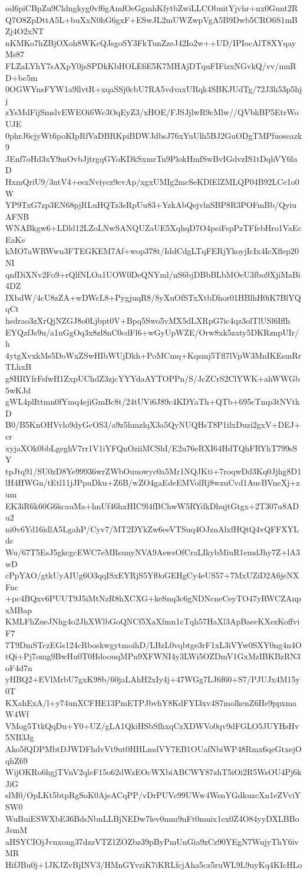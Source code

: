 od6piCBpZu9Cldngkyg0vf6gAmfOeGgmhKfytbZwiLLCObnitYjvhr+nx0Gunt2R
Q7O8ZpDttA5L+buXxN0hG6gxF+ESwJL2mUWZwpVgA5B9Dwb5CRO6S1mBZj4O2xNT
nKMKo7hZBjOXoh8WKcQJsgoSY3FkTunZzeJ42Io2w++UD/IPIocAlT8XYqayMs87
FLZaLYhY7sAXpY0jsSPDkKbHOLE6E5K7MHAjDTquFIFizxNGvkQ/vv/muRD+bc5m
0OGWYnsFYW1a9llvtR+xqaSSj0cbU7RA5vdvaxURqk4SBKJUdTg/72J3h53p5hjj
zYsMdFijSmslvEWEOi6Wc3OqEyZ3/xHOE/FJSJjlwR9cMlw//QVbkBP5EtrWoUJE
0phrJ6cjyWt6poKIpRfVaDBRKpiBDWJdbsJ76xYuUlh5BJ2GuODgTMPfuoseazk9
JEnf7oHd3xY9mOvbJjtrgqGYoKDkSxmrTn9PlokHmfSwBvIGdvzIS1tDqhVY6laD
HxmQriU9/3ntV4+esxNviycz9cvAp/xgxUMIg2mcSeKDlElZMLQP04B92LCe1o0W
YP9TxG7zp3EN68pjRLuHQTz3sRpUu83+YzkAbQejvlnSBP8R3POFmBb/QyiuAFNB
WNABkgw6+LDld12LZoLNwSANQUZaUE5XqhqD7O4peiFspPzTFfebHro1VaEcEaKe
kMO7aWRWwu3FTEGKEM7Af+wop378t/IddCdgLTqFERjYkoyjIcIx4IcXflep20NI
qnfDiXNv2Fo9+rQlfNLOa1UOW0DeQNYml/nS6bjDBbBLbMOeU3fbo9XjiMaBi4DZ
IXbdW/4cU8zZA+wDWcL8+PygjuqR8/8yXuOfSTxXtbDhor01HBlhH0iK7BlYQqCt
hsdrao3zXrQjNZGJ8o0Ljbpt0V+Bpq5Swo5vMX5dLXRpG7ic4qz3olTlUSl6Iffh
EYQzfJs9u/a1nGgOq3x8zl8nC0cdFl6+wGyUpWZE/Orw8xk5zaty5DKRznpUIr/h
4ytgXvxkMs5DoWxZSwHIbWUjDkh+PoMCmq+Kqsmj5Tfl7lVpW3MnIKEsmRrTLhxB
g8HRYfrFsfwH1ZxpUChdZ3zjcYYYdaAYTOPPn/S/JcZCrS2ClYWK+ahWWGb5wKJd
gWL4plIttmn0fYmq4ejiGmBc8t/24tUVi6J89c4KDYaTh+QTb+695cTmp3tNVtkD
B0/B5KnOHVvlo9dyGcOS3/a9z5hmzlqX3a5QyNUQHsT8P1ilxDuzi2gxV+DEJ+cr
xyjaXOk0bbLgeghV7rr1V1iYFQnOziiMCShI/E2u76eRXI64HdTQhFRYhT799sSY
tpJtq91/SU0zD8Ye99936wrZWbOuuowyc0a5Mr1NQJKti+7roqwDd3Kq0Jjhg8D1
lH4HWGn/tEtl11jJPpuDku+Z6B/wZO4gaEdeEMVolRj8wzuCvd1AucBVneXj+zum
EK3iR6k60G6kcauMa+hnUf46hxHIC9l4fBChwW5RYdkDhujtGtgx+2T307u8ADu2
ni0v6Yd16idlA5LgahP/Cyv7/MT2DYkZw6eeVTSuq4OJznAlxfHQtQ4vQFFXYLdc
Wu/67T5EsJ5gkcgcEWC7eMRsunyNVA9AswsOfCraLIkybMiuR1emdJhy7Z+lA3wD
cPpYAO/gtkUyAIUg6O3qqISxEYRjS5Yf0oGEHgCy4eUS57+7MxUZiD2A6jeNXFnc
+pc4BQxv6PUUT9J5iMtNzR8hXCXG+keSnq3c6gNDNcneCeyTO47yRWCZAnpxMBap
KMLFhZueJNhg4o2JhXWlbGoQNCf5XaXfmn1cTqh57HaXl3ApBaecKXezKoffviF7
7T9DmSTczEGs124cRboskwgytmoihD/LBzL0vqbtge3rF1xL3iVYw0SXY0ng4n4O
tQi+Pj7omg9BwHu0T0HdoouqMPn9XFWNI4y3LWi5OZDmV1GxMzIBKBzRN3oF4d7n
yHBQ2+EVlMrbU7gxK98b/60jaLAhH2xIy4j+47WGg7LJ6f60+S7/PJUJx4M15y0T
KXahExA/l+y74unXCFHE13PmETPJbvhY8KdFYI3xv4S7molkenZ6He9ppxmaW4Wf
VMog5TtkQqDu+Y0+UZ/gLA1QkiHSbSfhxqCzXDWVo0qv9dFGLO5JUYHsHv5NB3Jg
Ako5fQDPMbtDJWDFhdvVt9ut0HHLmdVY7EB1OUafNbiWP48Rmx6qeGtxejOqhZ69
WijOKRo6hgjTVnV2qleF15o62dWzEOcWXbiABCWY87zhT5iOi2R5WsOU4Pj6kJiG
slM0/OpLKt5btpRgSoK0AjeACqPP/vDrPUVc99UWw4WsnYGdkuzcXn1eZVviYSW0
WuBuiESWXbE36BdsNbnLLBjNEDw7lev0mm9nFt0muix1ex0Z4O84yyDXLBBoJsmM
aHSYCIOjJvnxong37dzzVTZ1ZOZbz39pByPmUnGia9zCz90YEgN7WujyThY6ivMR
HifJBu0j+1JKJZvBjINV3/HMnGYvziK7iKRLfcjAha5cz5ruWL9L9uyKq4KIcHLo

